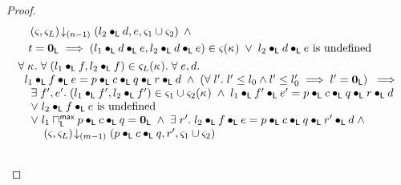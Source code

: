 \begin{lemma}[]
\begin{proof}
\begin{align}
	&\hspace*{0.5cm} \extendsAMUpto{\amod{}, \amod{L}}{(n-1)}{l_2 \composeL d}{e}{\amod{1} \cup \amod{2}} \;\land \nonumber\\
	& \hspace*{0.5cm} t = \unitL \implies (l_1 \composeL d \composeL e, l_2 \composeL d \composeL e) \in \amod{}(\ca{}) 
\;\lor\; l_2 \composeL d \composeL e \text{ is undefined} \label{LM:Goal1}\\
%
	&\begin{array}{l}
		\for{\ca{}} \for{(l_1 \composeL f, l_2 \composeL f) \in \amod{L}(\ca{})} \for{e, d} \\
  \hspace*{0.2cm} l_1 \composeL f \composeL e = p \composeL c \composeL q \composeL r \composeL d \;\land\; \left(\for{l'} l' \leq l_0 \land l' \leq l'_0 \implies l' = \unitL\right)  \;\implies\\
  \hspace*{0.4cm}\exsts{f', e'} (l_1 \composeL f', l_2 \composeL f') \in \amod{1} \cup \amod{2}(\ca{}) \;\land\; l_1 \composeL f' \composeL e' =  p \composeL c \composeL q \composeL r \composeL d\\
		\hspace*{0.4cm}\lor\;l_2 \composeL f \composeL e \text{ is undefined}\\
		\hspace*{0.4cm}\lor\; l_1 \maxMeetL p \composeL c \composeL q  = \unitL \;\land\; \exsts{r'} l_2 \composeL f \composeL e = p \composeL c \composeL q \composeL r' \composeL d \;\land\\
		\hspace*{0.8cm} \extendsAMUpto{\amod{}, \amod{L}}{(m-1)}{p \composeL c \composeL q}{r'}{\amod{1} \cup \amod{2}}
	\end{array}\label{LM:Goal2}\\\nonumber
\end{align}
%


\end{proof}
\end{lemma}
